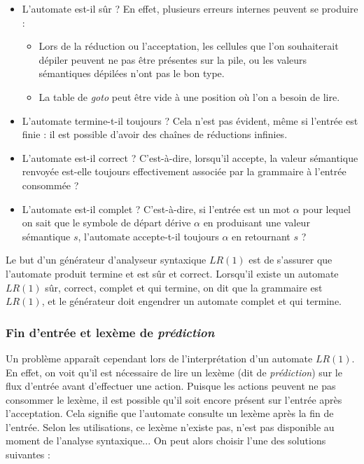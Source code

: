 \documentclass[a4paper,11pt]{article}
\begin{document}
\begin{itemize}
\item L'automate est-il sûr ? En effet, plusieurs erreurs internes
  peuvent se produire :
  \begin{itemize}
  \item Lors de la réduction ou l'acceptation, les cellules que l'on
    souhaiterait dépiler peuvent ne pas être présentes sur la pile, ou
    les valeurs sémantiques dépilées n'ont pas le bon type.
  \item La table de \emph{goto} peut être vide à une position où l'on
    a besoin de lire.
  \end{itemize}
\item L'automate termine-t-il toujours ? Cela n'est pas évident, même
  si l'entrée est finie : il est possible d'avoir des chaînes de
  réductions infinies.
\item L'automate est-il correct ? C'est-à-dire, lorsqu'il accepte, la
  valeur sémantique renvoyée est-elle toujours effectivement associée
  par la grammaire à l'entrée consommée ?
\item L'automate est-il complet ? C'est-à-dire, si l'entrée est un mot
  $\alpha$ pour lequel on sait que le symbole de départ dérive $\alpha$
  en produisant une valeur sémantique $s$, l'automate accepte-t-il
  toujours $\alpha$ en retournant $s$ ?
\end{itemize}

Le but d'un générateur d'analyseur syntaxique $LR(1)$ est de s'assurer
que l'automate produit termine et est sûr et correct. Lorsqu'il existe
un automate $LR(1)$ sûr, correct, complet et qui termine, on dit que
la grammaire est $LR(1)$, et le générateur doit engendrer un automate
complet et qui termine.

\subsubsection{Fin d'entrée et lexème de \emph{prédiction}}

Un problème apparaît cependant lors de l'interprétation d'un automate
$LR(1)$. En effet, on voit qu'il est nécessaire de lire un lexème (dit
de \emph{prédiction}) sur le flux d'entrée avant d'effectuer une
action. Puisque les actions peuvent ne pas consommer le lexème, il est
possible qu'il soit encore présent sur l'entrée après
l'acceptation. Cela signifie que l'automate consulte un lexème après
la fin de l'entrée. Selon les utilisations, ce lexème n'existe pas,
n'est pas disponible au moment de l'analyse syntaxique... On peut
alors choisir l'une des solutions suivantes :
\end{document}
